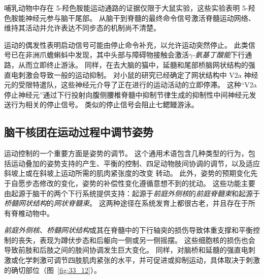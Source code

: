 哺乳动物中存在 5-羟色胺能运动通路的证据仅限于大鼠实验，这些实验表明 5-羟色胺能神经元参与脑干尾部。
从脑干到脊髓的最终命令信号激活脊髓运动网络、维持其活动并允许表达不同步态的机制尚不清楚。


运动的偶发性表明启动信号可能由停止命令补充，以允许运动突然停止。
此类信号已在非洲爪蟾蝌蚪中发现，其中头部与障碍物接触会激活\textit{$\gamma$-氨基丁酸能}下行通路，从而立即终止游泳。
同样，在去大脑的猫中，延髓和尾部桥脑网状结构的强直电刺激会导致一般的运动抑制。
对小鼠的研究已经确定了网状结构中 V2a 神经元的受限特遣队，这些神经元介导了正在进行的运动活动的立即停滞。
这种“V2a 停止神经元”通过下行投射向腹侧腰椎脊髓中抑制节律生成的抑制性中间神经元发送行为相关的停止信号。
类似的停止信号会阻止七鳃鳗游泳。



\subsection{脑干核团在运动过程中调节姿势}

运动控制的一个重要方面是姿势的调节。
这个通用术语包含几种类型的行为，包括运动叠加的姿势支持的产生、平衡的控制、四足动物肢间协调的调节，以及适应斜坡上或在斜坡上运动所需的肌肉紧张度的改变 转动。
此外，姿势的预期变化先于自愿步态修改的变化，姿势的补偿性变化遵循意想不到的扰动。
这些功能主要由起源于脑干的两个下行系统提供支持：起源于\textit{前庭外侧核}的\textit{前庭脊髓束}和起源于\textit{桥髓网状结构}的\textit{网状脊髓束}。
这两种途径在系统发育上都很古老，并且存在于所有脊椎动物中。


\textit{前庭外侧核}、\textit{桥髓网状结构}或其在脊髓中的下行轴突的损伤导致体重支撑和平衡控制的丧失，表现为蹲伏步态和后躯向一侧或另一侧摇摆。
这些细胞核的损伤也会导致前肢和后肢之间的肢间协调发生巨大变化。
同样，对脑桥和延髓的强直电刺激或化学刺激可调节四肢肌肉紧张的水平，并可促进或抑制运动，具体取决于刺激的确切部位（图~\ref{fig:33_12}）。


